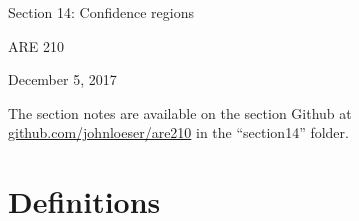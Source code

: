 \documentclass[12pt,english]{article}
\begin{document}
\begin{center}
{\Large{}Section 14: Confidence regions}
\par\end{center}{\Large \par}

\begin{center}
ARE 210
\par\end{center}

\begin{center}
December 5, 2017
\par\end{center}

The section notes are available on the section Github at \href{github.com/johnloeser/are210}{github.com/johnloeser/are210} in the ``section14'' folder.

\section{Definitions}
\end{document}
